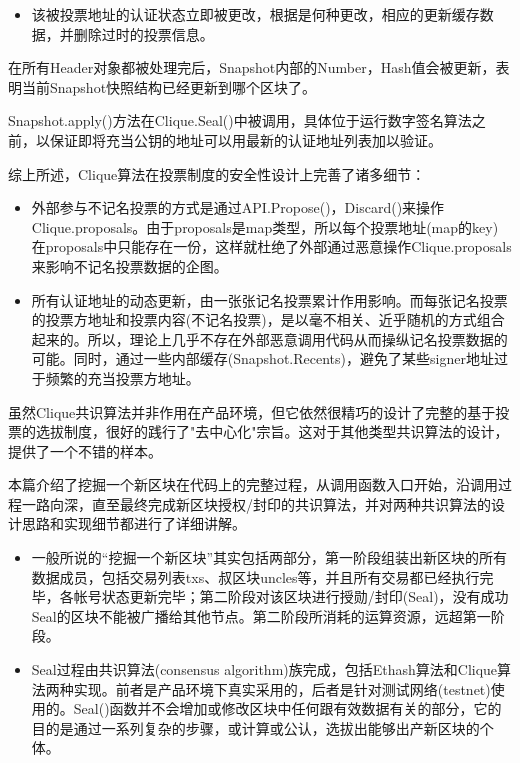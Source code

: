 \documentclass[UTF8]{ctexart}
\begin{document}
{\begin{itemize}
\item 该被投票地址的认证状态立即被更改，根据是何种更改，相应的更新缓存数据，并删除过时的投票信息。

\end{itemize}

在所有Header对象都被处理完后，Snapshot内部的Number，Hash值会被更新，表明当前Snapshot快照结构已经更新到哪个区块了。

Snapshot.apply()方法在Clique.Seal()中被调用，具体位于运行数字签名算法之前，以保证即将充当公钥的地址可以用最新的认证地址列表加以验证。



综上所述，Clique算法在投票制度的安全性设计上完善了诸多细节：

\begin{itemize}

\item 外部参与不记名投票的方式是通过API.Propose()，Discard()来操作Clique.proposals。由于proposals是map类型，所以每个投票地址(map的key)在proposals中只能存在一份，这样就杜绝了外部通过恶意操作Clique.proposals来影响不记名投票数据的企图。

\item 所有认证地址的动态更新，由一张张记名投票累计作用影响。而每张记名投票的投票方地址和投票内容(不记名投票)，是以毫不相关、近乎随机的方式组合起来的。所以，理论上几乎不存在外部恶意调用代码从而操纵记名投票数据的可能。同时，通过一些内部缓存(Snapshot.Recents)，避免了某些signer地址过于频繁的充当投票方地址。

\end{itemize}

虽然Clique共识算法并非作用在产品环境，但它依然很精巧的设计了完整的基于投票的选拔制度，很好的践行了"去中心化"宗旨。这对于其他类型共识算法的设计，提供了一个不错的样本。


本篇介绍了挖掘一个新区块在代码上的完整过程，从调用函数入口开始，沿调用过程一路向深，直至最终完成新区块授权/封印的共识算法，并对两种共识算法的设计思路和实现细节都进行了详细讲解。

\begin{itemize}

\item 一般所说的“挖掘一个新区块”其实包括两部分，第一阶段组装出新区块的所有数据成员，包括交易列表txs、叔区块uncles等，并且所有交易都已经执行完毕，各帐号状态更新完毕；第二阶段对该区块进行授勋/封印(Seal)，没有成功Seal的区块不能被广播给其他节点。第二阶段所消耗的运算资源，远超第一阶段。

\item Seal过程由共识算法(consensus algorithm)族完成，包括Ethash算法和Clique算法两种实现。前者是产品环境下真实采用的，后者是针对测试网络(testnet)使用的。Seal()函数并不会增加或修改区块中任何跟有效数据有关的部分，它的目的是通过一系列复杂的步骤，或计算或公认，选拔出能够出产新区块的个体。


\end{itemize}}
\end{document}
